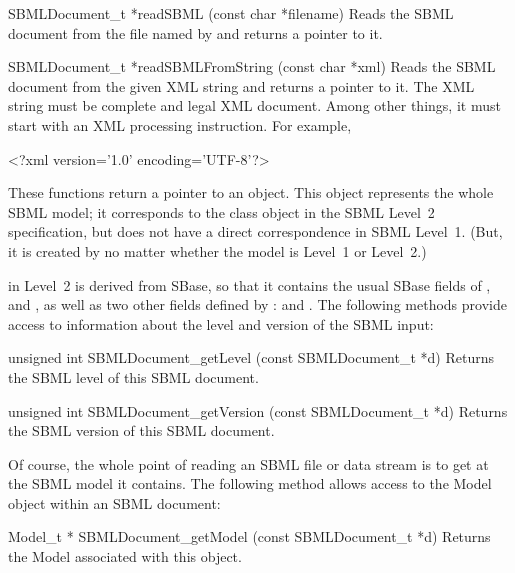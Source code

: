 \documentclass{sbmlmanual}
\begin{document}
\begin{methoddef}{SBMLDocument\_t *readSBML (const char *filename)}
  Reads the SBML document from the file named by  and
  returns a pointer to it.
\end{methoddef}

\begin{methoddef}{SBMLDocument\_t *readSBMLFromString (const char *xml)}
  Reads the SBML document from the given XML string and returns a pointer
  to it.
  The XML string must be complete and legal XML document.  Among other
  things, it must start with an XML processing instruction.  For example,
  \begin{example}
    <?xml version='1.0' encoding='UTF-8'?>
  \end{example}
\end{methoddef}


These functions return a pointer to an  object.
This object represents the whole SBML model; it corresponds to the
 class object in the SBML Level~2 specification, but does not
have a direct correspondence in SBML Level~1.  (But, it is created by
\libsbml{} no matter whether the model is Level~1 or Level~2.)

 in Level~2 is derived from SBase, so that it
contains the usual SBase fields of ,  and
, as well as two other fields defined by :
 and .  The following methods provide access
to information about the level and version of the SBML input:


\begin{methoddef}{unsigned int SBMLDocument\_getLevel (const SBMLDocument\_t *d)}
  Returns the SBML level of this SBML document.
\end{methoddef}


\begin{methoddef}{unsigned int SBMLDocument\_getVersion (const SBMLDocument\_t *d)}
  Returns the SBML version of this SBML document.
\end{methoddef}


Of course, the whole point of reading an SBML file or data stream is to get
at the SBML model it contains.  The following method allows access to the
Model object within an SBML document:


\begin{methoddef}{Model\_t * SBMLDocument\_getModel (const SBMLDocument\_t *d)}
  Returns the Model associated with this  object.
\end{methoddef}
\end{document}
